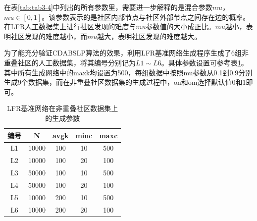 在表\ref{tab:tab3-4}中列出的所有参数里，需要进一步解释的是混合参数$mu$，$ mu \in [0,1]$。该参数表示的是社区内部节点与社区外部节点之间存在边的概率。在LFR人工数据集上进行社区发现的难度与$mu$参数值的大小成正比。$mu$越小，表明社区发现的难度越小，而$mu$越大，表明社区发现的难度越大。

为了能充分验证CDABSLP算法的效果，利用LFR基准网络生成程序生成了6组非重叠社区的人工数据集，将其编号分别记为$L1\sim L6$。具体参数设置可参考表\ref{tab:tab3-5}。其中所有生成网络中的maxk均设置为500，每组数据中按照mu参数从0.1到0.9分别生成9个数据集，而在非重叠社区数据集的生成过程中，on和om选择默认值0和1即可。

\begin{table}
  \centering
  \caption{LFR基准网络在非重叠社区数据集上的生成参数} \label{tab:tab3-5}
  \begin{tabular*}{0.9\textwidth}{@{\extracolsep{\fill}}ccccc}
  \toprule
    编号		&N  &avgk  &minc &maxc \\
  \midrule
    L1  &10000  &100  &10 &500 \\
    L2  &10000  &100  &20 &100 \\
    L3  &50000  &100  &10 &500 \\
    L4  &50000  &100  &20 &100 \\
    L5  &10000  &200  &10 &500 \\
    L6  &10000  &200  &20 &100 \\
  \bottomrule
  \end{tabular*}
\end{table}

